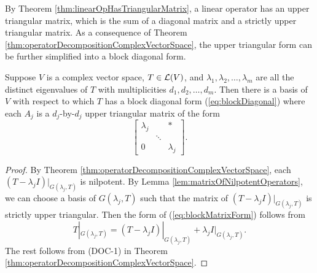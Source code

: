 \begin{rem}
  By Theorem \ref{thm:linearOpHasTriangularMatrix},
   a linear operator
   has an upper triangular matrix,
   which is the sum of a diagonal matrix
   and a strictly upper triangular matrix.
  As a consequence of Theorem
  \ref{thm:operatorDecompositionComplexVectorSpace}, 
  the upper triangular form
  can be further simplified
  into a block diagonal form.
\end{rem}

\begin{thm}
  \label{thm:blockMatrixOpDecomposition}
  Suppose $V$ is a complex vector space,
  \mbox{$T\in {\cal L}(V)$}, 
  and $\lambda_1, \lambda_2, \ldots, \lambda_m$
  are all the distinct eigenvalues of $T$
  with multiplicities $d_1, d_2, \ldots, d_m$.
  Then there is a basis of $V$
  with respect to which $T$ has a block diagonal form
  (\ref{eq:blockDiagonal}) where each $A_j$
  is a $d_j$-by-$d_j$ upper triangular matrix of the form
  \begin{equation}
    \label{eq:blockMatrixForm}
    \begin{bmatrix}
      \lambda_j & & *
      \\
      & \ddots &
      \\
      0 & & \lambda_j
    \end{bmatrix}.
  \end{equation}
\end{thm}
\begin{proof}
  By Theorem
  \ref{thm:operatorDecompositionComplexVectorSpace},
  each \mbox{$(T-\lambda_jI)|_{G(\lambda_j, T)}$} is nilpotent.
  By Lemma \ref{lem:matrixOfNilpotentOperators},
  we can choose a basis of $G(\lambda_j, T)$
  such that the matrix of $(T-\lambda_jI)|_{G(\lambda_j, T)}$
  is strictly upper triangular.
  Then the form of (\ref{eq:blockMatrixForm})
  follows from
  \begin{displaymath}
    T|_{G(\lambda_j, T)}
    = (T-\lambda_jI)|_{G(\lambda_j, T)}
    + \lambda_jI|_{G(\lambda_j, T)}.
  \end{displaymath}
  The rest follows from (DOC-1) in Theorem
  \ref{thm:operatorDecompositionComplexVectorSpace}.
\end{proof}

